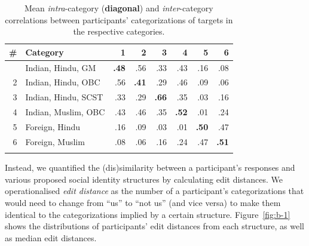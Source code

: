 \documentclass[12pt, a4paper]{article}
\begin{document}
\begin{table}
\centering
{}
\caption[Mean intra and inter-category correlations for target categorizations]{Mean \emph{intra}-category (\textbf{diagonal}) and \emph{inter}-category correlations between participants' categorizations of targets in the respective categories.}
\small	
\begin{tabular}{rlrrrr|rr} \toprule
\# & Category            & 1   & 2   & 3   & 4   & 5   & 6   \\ \midrule \addlinespace
1  & Indian, Hindu, GM   & \textbf{.48} & .56 & .33 & .43 & .16 & .08 \\
2  & Indian, Hindu, OBC  & .56 & \textbf{.41} & .29 & .46 & .09 & .06 \\
3  & Indian, Hindu, SCST & .33 & .29 & \textbf{.66} & .35 & .03 & .16 \\
4  & Indian, Muslim, OBC & .43 & .46 & .35 & \textbf{.52} & .01 & .24 \\ \midrule
5  & Foreign, Hindu      & .16 & .09 & .03 & .01 & \textbf{.50} & .47 \\
6  & Foreign, Muslim     & .08 & .06 & .16 & .24 & .47 & \textbf{.51} \\ \addlinespace \bottomrule
\end{tabular}
\label{tab:b-1}
\end{table}

Instead, we quantified the (dis)similarity between a participant's responses and various proposed social identity structures by calculating edit distances. We operationalised \emph{edit distance} as the number of a participant's categorizations that would need to change from ``us'' to ``not us'' (and vice versa) to make them identical to the categorizations implied by a certain structure. Figure~\ref{fig:b-1} shows the distributions of participants' edit distances from each structure, as well as median edit distances. 
\end{document}
